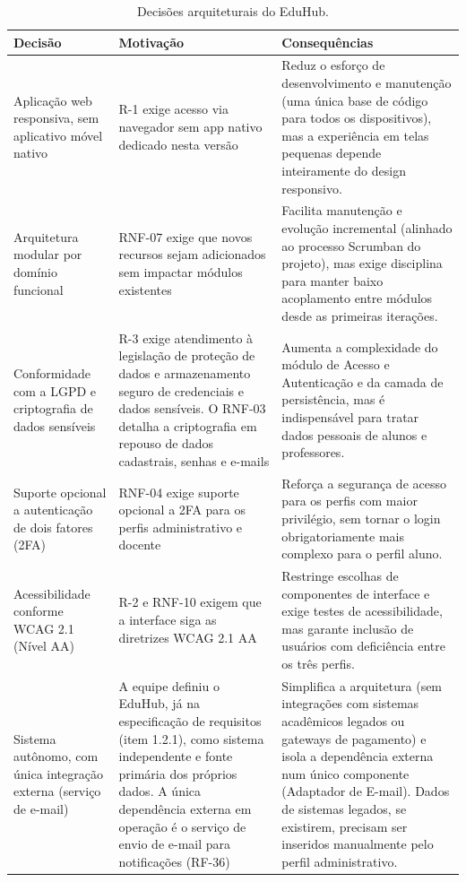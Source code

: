 \begin{table}[ht]
\centering
\caption{Decisões arquiteturais do EduHub.}
\begin{tabularx}{\textwidth}{p{} X X}
\toprule
\textbf{Decisão} & \textbf{Motivação} & \textbf{Consequências} \\
\midrule
Aplicação web responsiva, sem aplicativo móvel nativo &
R-1 exige acesso via navegador sem app nativo dedicado nesta versão &
Reduz o esforço de desenvolvimento e manutenção (uma única base de código
para todos os dispositivos), mas a experiência em telas pequenas depende
inteiramente do design responsivo. \\
Arquitetura modular por domínio funcional &
RNF-07 exige que novos recursos sejam adicionados sem impactar módulos
existentes &
Facilita manutenção e evolução incremental (alinhado ao processo Scrumban do
projeto), mas exige disciplina para manter baixo acoplamento entre módulos
desde as primeiras iterações. \\
Conformidade com a LGPD e criptografia de dados sensíveis &
R-3 exige atendimento à legislação de proteção de dados e armazenamento
seguro de credenciais e dados sensíveis. O RNF-03 detalha a criptografia em
repouso de dados cadastrais, senhas e e-mails &
Aumenta a complexidade do módulo de Acesso e Autenticação e da camada de
persistência, mas é indispensável para tratar dados pessoais de alunos e
professores. \\
Suporte opcional a autenticação de dois fatores (2FA) &
RNF-04 exige suporte opcional a 2FA para os perfis administrativo e docente &
Reforça a segurança de acesso para os perfis com maior privilégio, sem
tornar o login obrigatoriamente mais complexo para o perfil aluno. \\
Acessibilidade conforme WCAG 2.1 (Nível AA) &
R-2 e RNF-10 exigem que a interface siga as diretrizes WCAG 2.1 AA &
Restringe escolhas de componentes de interface e exige testes de
acessibilidade, mas garante inclusão de usuários com deficiência entre os
três perfis. \\
Sistema autônomo, com única integração externa (serviço de e-mail) &
A equipe definiu o EduHub, já na especificação de requisitos (item 1.2.1),
como sistema independente e fonte primária dos próprios dados. A única
dependência externa em operação é o serviço de envio de e-mail para
notificações (RF-36) &
Simplifica a arquitetura (sem integrações com sistemas acadêmicos legados ou
gateways de pagamento) e isola a dependência externa num único componente
(Adaptador de E-mail). Dados de sistemas legados, se existirem, precisam ser
inseridos manualmente pelo perfil administrativo. \\
\bottomrule
\end{tabularx}
\end{table}

